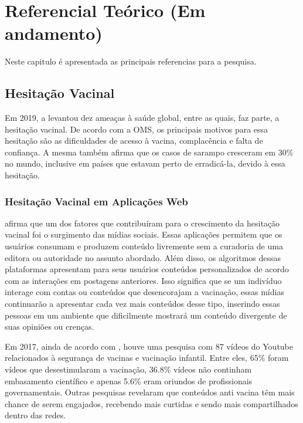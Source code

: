\chapter[Referencial Teórico]{Referencial Teórico (Em andamento)}

Neste capitulo é apresentada as principais referencias para a pesquisa.

\section{Hesitação Vacinal}
Em 2019, a \cite{noauthor_ten_nodate} levantou dez ameaças à saúde global, entre as quais, faz parte, a hesitação vacinal. De acordo com a OMS, os principais motivos para essa hesitação são as dificuldades de acesso à vacina, complacência e falta de confiança. A mesma também afirma que os casos de sarampo cresceram em 30\% no mundo, inclusive em países que estavam perto de erradicá-la, devido à essa hesitação.

    \subsection{Hesitação Vacinal em Aplicações Web}
    
    \cite{puri_social_2020} afirma que um dos fatores que contribuíram para o crescimento da hesitação vacinal foi o surgimento das mídias sociais. Essas aplicações permitem que os usuários consumam e produzem conteúdo livremente sem a curadoria de uma editora ou autoridade no assunto abordado. Além disso, os algoritmos dessas plataformas apresentam para seus usuários conteúdos personalizados de acordo com as interações em postagens anteriores. Isso significa que se um indivíduo interage com contas ou conteúdos que desencorajam a vacinação, essas mídias continuarão a apresentar cada vez mais conteúdos desse tipo, inserindo essas pessoas em um ambiente que dificilmente mostrará um conteúdo divergente de suas opiniões ou crenças.
    
    Em 2017, ainda de acordo com \cite{puri_social_2020}, houve uma pesquisa com 87 vídeos do Youtube relacionados à segurança de vacinas e vacinação infantil. Entre eles, 65\% foram vídeos que desestimularam a vacinação, 36.8\% vídeos não continham embasamento científico e apenas 5.6\% eram oriundos de profissionais governamentais. Outras pesquisas revelaram que conteúdos anti vacina têm mais chance de serem engajados, recebendo mais curtidas e sendo mais compartilhados dentro das redes.
    
